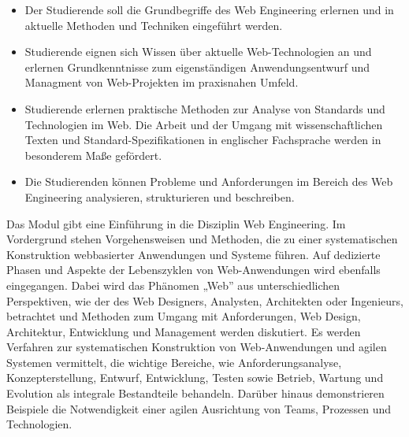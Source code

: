 \begin{module}
\begin{learningoutcomes}
\begin{itemize}\item Der Studierende soll die Grundbegriffe des Web Engineering erlernen und in aktuelle Methoden und Techniken eingeführt werden.  \item Studierende eignen sich Wissen über aktuelle Web-Technologien an und erlernen Grundkenntnisse zum eigenständigen Anwendungsentwurf und Managment von Web-Projekten im praxisnahen Umfeld.   \item Studierende erlernen praktische Methoden zur Analyse von Standards und Technologien im Web. Die Arbeit und der Umgang mit wissenschaftlichen Texten und Standard-Spezifikationen in englischer Fachsprache werden in besonderem Maße gefördert.  \item  Die Studierenden können Probleme und Anforderungen im Bereich des Web Engineering analysieren, strukturieren und beschreiben.  \end{itemize}
\end{learningoutcomes}

\begin{content}
Das Modul gibt eine Einführung in die Disziplin Web Engineering. Im Vordergrund stehen Vorgehensweisen und Methoden, die zu einer systematischen Konstruktion webbasierter Anwendungen und Systeme führen. Auf dedizierte Phasen und Aspekte der Lebenszyklen von Web-Anwendungen wird ebenfalls eingegangen. Dabei wird das Phänomen „Web” aus unterschiedlichen Perspektiven, wie der des Web Designers, Analysten, Architekten oder Ingenieurs, betrachtet und Methoden zum Umgang mit Anforderungen, Web Design, Architektur, Entwicklung und Management werden diskutiert. Es werden Verfahren zur systematischen Konstruktion von Web-Anwendungen und agilen Systemen vermittelt, die wichtige Bereiche, wie Anforderungsanalyse, Konzepterstellung, Entwurf, Entwicklung, Testen sowie Betrieb, Wartung und Evolution als integrale Bestandteile behandeln. Darüber hinaus demonstrieren Beispiele die Notwendigkeit einer agilen Ausrichtung von Teams, Prozessen und Technologien.


\end{content}



\end{module}

